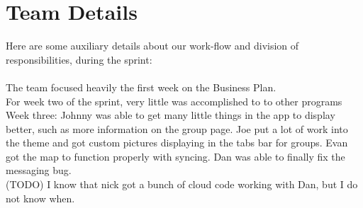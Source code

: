 \documentclass[11pt]{article}
\begin{document}
	
\section*{Team Details}
Here are some auxiliary details about our work-flow and division of responsibilities, during the sprint: \\\\

The team focused heavily the first week on the Business Plan.\\

For week two of the sprint, very little was accomplished to to other programs\\

Week three: Johnny was able to get many little things in the app to display better, such as more information on the group page. Joe put a lot of work into the theme and got custom pictures displaying in the tabs bar for groups. Evan got the map to function properly with syncing. Dan was able to finally fix the messaging bug.\\

(TODO) I know that nick got a bunch of cloud code working with Dan, but I do not know when.
\end{document}
